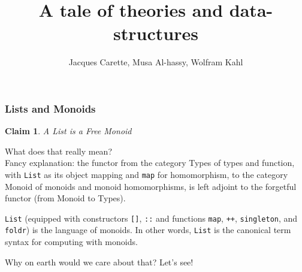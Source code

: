 \documentclass[serif,mathserif,professionalfont,10pt]{beamer}
\title{A tale of theories and data-structures}
\author[Carette, Al-hassy, Kahl]{Jacques Carette, Musa Al-hassy, Wolfram Kahl}
\institute[McMaster]{McMaster University, Hamilton}
\newcommand{\sred}[1]{\textcolor{slidered}{#1}}
\newcommand{\sblue}[1]{\textcolor{slideblue}{#1}}
\newcommand{\sgreen}[1]{\textcolor{slidegreen}{#1}}
\newtheorem{claim}{Claim}
\begin{document}
\frame{\titlepage}

\begin{frame}
\frametitle{Lists and Monoids}
\begin{claim}
A \sred{List} is a \sred{Free Monoid}
\end{claim}
What does that really mean? \\

\pause
\vspace*{4mm}
\sred{Fancy explanation}: the functor from the category \textsf{Types} of \sgreen{types and function}, with
\texttt{List} as its object mapping and \texttt{map} for homomorphism,
to the category \textsf{Monoid} of \sgreen{monoids and monoid homomorphisms}, is \sblue{left
adjoint} to the forgetful functor (from \textsf{Monoid} to \textsf{Types}).
%
%

\pause
\vspace*{4mm}
\texttt{List} (equipped with constructors \texttt{[]}, \texttt{::} and
functions \texttt{map}, \texttt{++},
\texttt{singleton}, and \texttt{foldr}) is the
\sblue{language of monoids}. In other words, \texttt{List} 
is the canonical term syntax for 
\sblue{computing with monoids}.

\pause
\vspace*{4mm}
Why on earth would we care about that? Let's see!

\vfill
\end{frame}
\end{document}
